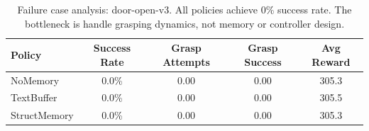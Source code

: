 \begin{table}[htbp]
\centering
\caption{Failure case analysis: door-open-v3. All policies achieve 0\% success rate. The bottleneck is handle grasping dynamics, not memory or controller design.}
\label{tab:failure}
\begin{tabular}{lcccc}
\toprule
Policy & Success Rate & Grasp Attempts & Grasp Success & Avg Reward \\
\midrule
NoMemory & 0.0\% & 0.00 & 0.00 & 305.3 \\
TextBuffer & 0.0\% & 0.00 & 0.00 & 305.5 \\
StructMemory & 0.0\% & 0.00 & 0.00 & 305.3 \\
\bottomrule
\end{tabular}
\end{table}
